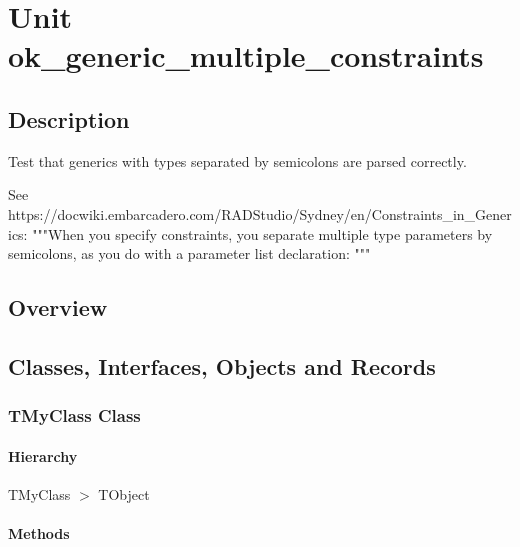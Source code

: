 \documentclass{report}
\begin{document}
\newlength{\tmplength}
\chapter{Unit ok{\_}generic{\_}multiple{\_}constraints}
\section{Description}
Test that generics with types separated by semicolons are parsed correctly.\hfill\vspace*{1ex}

 See https://docwiki.embarcadero.com/RADStudio/Sydney/en/Constraints{\_}in{\_}Generics: """When you specify constraints, you separate multiple type parameters by semicolons, as you do with a parameter list declaration: """
\section{Overview}
\begin{description}
\item[\texttt{\begin{ttfamily}TMyClass\end{ttfamily} Class}]
\item[\texttt{\begin{ttfamily}TMyClassWithConstraints\end{ttfamily} Class}]
\item[\texttt{\begin{ttfamily}TMyClassWithConstraints2\end{ttfamily} Class}]
\end{description}
\section{Classes, Interfaces, Objects and Records}
\subsection*{TMyClass Class}
\subsubsection*{\large{\textbf{Hierarchy}}\normalsize\hspace{1ex}\hfill}
TMyClass {$>$} TObject
\subsubsection*{\large{\textbf{Methods}}\normalsize\hspace{1ex}\hfill}
\end{document}
